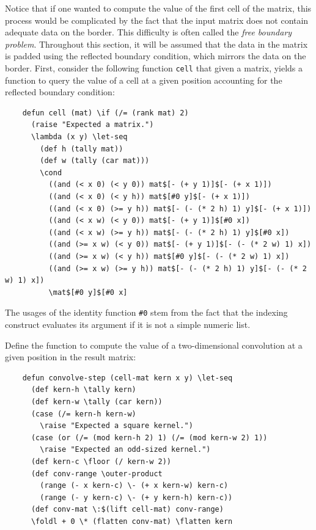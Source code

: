 Notice that if one wanted to compute the value of the first cell of the matrix, this process would be complicated by the fact that the input matrix does not contain adequate data on the border. This difficulty is often called the \textit{free boundary problem}. Throughout this section, it will be assumed that the data in the matrix is padded using the reflected boundary condition, which mirrors the data on the border. First, consider the following function \verb|cell| that given a matrix, yields a function to query the value of a cell at a given position accounting for the reflected boundary condition:

\begin{Verbatim}
    defun cell (mat) \if (/= (rank mat) 2)
      (raise "Expected a matrix.")
      \lambda (x y) \let-seq
        (def h (tally mat))
        (def w (tally (car mat)))
        \cond
          ((and (< x 0) (< y 0)) mat$[- (+ y 1)]$[- (+ x 1)])
          ((and (< x 0) (< y h)) mat$[#0 y]$[- (+ x 1)])
          ((and (< x 0) (>= y h)) mat$[- (- (* 2 h) 1) y]$[- (+ x 1)])
          ((and (< x w) (< y 0)) mat$[- (+ y 1)]$[#0 x])
          ((and (< x w) (>= y h)) mat$[- (- (* 2 h) 1) y]$[#0 x])
          ((and (>= x w) (< y 0)) mat$[- (+ y 1)]$[- (- (* 2 w) 1) x])
          ((and (>= x w) (< y h)) mat$[#0 y]$[- (- (* 2 w) 1) x])
          ((and (>= x w) (>= y h)) mat$[- (- (* 2 h) 1) y]$[- (- (* 2 w) 1) x])
          \mat$[#0 y]$[#0 x]
\end{Verbatim}

The usages of the identity function \verb|#0| stem from the fact that the indexing construct evaluates its argument if it is not a simple numeric list.

Define the function to compute the value of a two-dimensional convolution at a given position in the result matrix:

\begin{Verbatim}
    defun convolve-step (cell-mat kern x y) \let-seq
      (def kern-h \tally kern)
      (def kern-w \tally (car kern))
      (case (/= kern-h kern-w)
        \raise "Expected a square kernel.")
      (case (or (/= (mod kern-h 2) 1) (/= (mod kern-w 2) 1))
        \raise "Expected an odd-sized kernel.")
      (def kern-c \floor (/ kern-w 2))
      (def conv-range \outer-product
        (range (- x kern-c) \- (+ x kern-w) kern-c)
        (range (- y kern-c) \- (+ y kern-h) kern-c))
      (def conv-mat \:$(lift cell-mat) conv-range)
      \foldl + 0 \* (flatten conv-mat) \flatten kern
\end{Verbatim}

